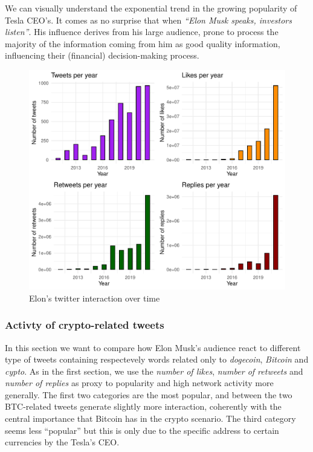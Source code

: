 \documentclass[
]{article}
\begin{document}
We can visually understand the exponential trend in the growing
popularity of Tesla CEO's. It comes as no surprise that when
\emph{``Elon Musk speaks, investors listen''}. His influence derives
from his large audience, prone to process the majority of the
information coming from him as good quality information, influencing
their (financial) decision-making process.

\begin{figure}
\centering
\includegraphics{Trial1_files/figure-latex/fi1s-1.pdf}
\caption{\label{fig:fig1}Elon's twitter interaction over time}
\end{figure}

\hypertarget{activty-of-crypto-related-tweets}{%
\subsubsection{Activty of crypto-related
tweets}\label{activty-of-crypto-related-tweets}}

In this section we want to compare how Elon Musk's audience react to
different type of tweets containing respectevely words related only to
\emph{dogecoin}, \emph{Bitcoin} and \emph{cypto}. As in the first
section, we use the \emph{number of likes}, \emph{number of retweets}
and \emph{number of replies} as proxy to popularity and high network
activity more generally. The first two categories are the most popular,
and between the two BTC-related tweets generate slightly more
interaction, coherently with the central importance that Bitcoin has in
the crypto scenario. The third category seems less ``popular'' but this
is only due to the specific address to certain currencies by the Tesla's
CEO.
\end{document}
